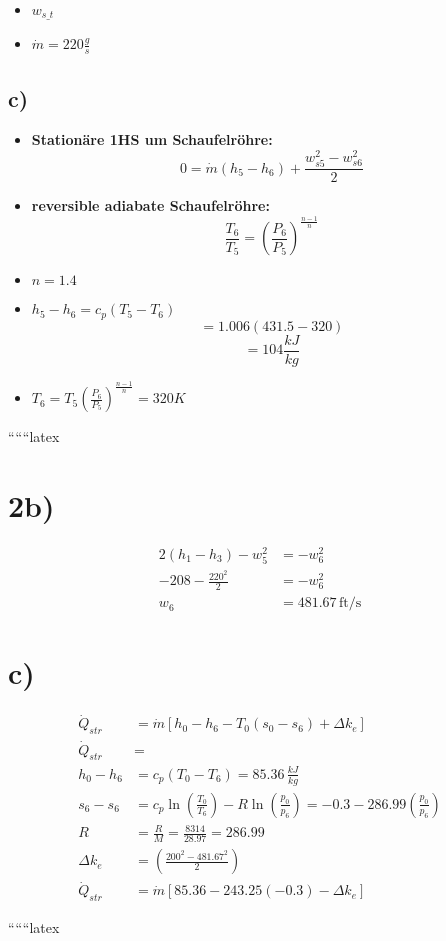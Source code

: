 \begin{itemize}
    \item \( w_{s\_t} \)
    \item \(\dot{m} = 220 \frac{g}{s} \)
\end{itemize}

\subsection*{c)}

\begin{itemize}
    \item \textbf{Stationäre 1HS um Schaufelröhre:}
    \[
    0 = \dot{m} \left( h_5 - h_6 \right) + \frac{w_{s5}^2 - w_{s6}^2}{2}
    \]
    \item \textbf{reversible adiabate Schaufelröhre:}
    \[
    \frac{T_6}{T_5} = \left( \frac{P_6}{P_5} \right)^{\frac{n-1}{n}}
    \]
    \item \( n = 1.4 \)
    \item \( h_5 - h_6 = c_p (T_5 - T_6) \)
    \[
    = 1.006 (431.5 - 320)
    \]
    \[
    = 104 \frac{kJ}{kg}
    \]
    \item \( T_6 = T_5 \left( \frac{P_6}{P_5} \right)^{\frac{n-1}{n}} = 320 K \)
\end{itemize}

``````latex

\section*{2b)}

\begin{align*}
2(h_1 - h_3) - w_5^2 &= -w_6^2 \\
-208 - \frac{220^2}{2} &= -w_6^2 \\
w_6 &= 481.67 \, \text{ft}/\text{s}
\end{align*}

\section*{c)}

\begin{align*}
\dot{Q}_{str} &= \dot{m} \left[ h_0 - h_6 - T_0(s_0 - s_6) + \Delta k_e \right] \\
\dot{Q}_{str} &= \\
h_0 - h_6 &= c_p (T_0 - T_6) = 85.36 \, \frac{kJ}{kg} \\
s_6 - s_6 &= c_p \ln \left( \frac{T_0}{T_6} \right) - R \ln \left( \frac{p_0}{p_6} \right) = -0.3 - 286.99 \left( \frac{p_0}{p_6} \right) \\
R &= \frac{R}{M} = \frac{8314}{28.97} = 286.99 \\
\Delta k_e &= \left( \frac{200^2 - 481.67^2}{2} \right) \\
\dot{Q}_{str} &= \dot{m} \left[ 85.36 - 243.25 (-0.3) - \Delta k_e \right]
\end{align*}

``````latex


